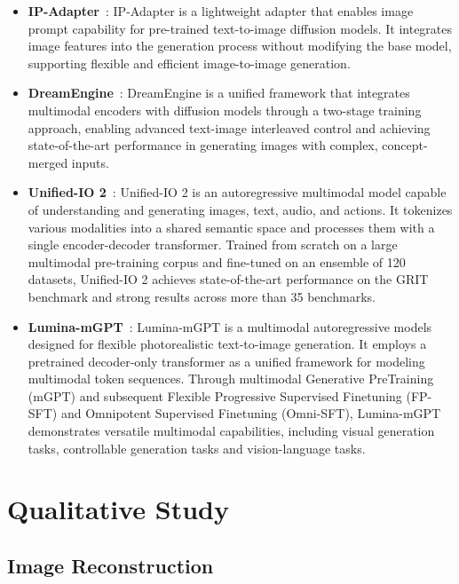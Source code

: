 \begin{itemize}[left=2pt, itemsep=0.5pt,topsep=0.5pt]
\item \textbf{IP-Adapter}~\citep{ye2023ip-adapter}: IP-Adapter is a lightweight adapter that enables image prompt capability for pre-trained text-to-image diffusion models. It integrates image features into the generation process without modifying the base model, supporting flexible and efficient image-to-image generation.

\item \textbf{DreamEngine}~\citep{dreamengine}: DreamEngine is a unified framework that integrates multimodal encoders with diffusion models through a two-stage training approach, enabling advanced text-image interleaved control and achieving state-of-the-art performance in generating images with complex, concept-merged inputs.

\item \textbf{Unified-IO 2}~\citep{lu2023unifiedio2}: Unified-IO 2 is an autoregressive multimodal model capable of understanding and generating images, text, audio, and actions. It tokenizes various modalities into a shared semantic space and processes them with a single encoder-decoder transformer. Trained from scratch on a large multimodal pre-training corpus and fine-tuned on an ensemble of 120 datasets, Unified-IO 2 achieves state-of-the-art performance on the GRIT benchmark and strong results across more than 35 benchmarks. 

\item \textbf{Lumina-mGPT}~\citep{2024lumina}: Lumina-mGPT is a multimodal autoregressive models designed for flexible photorealistic text-to-image generation. It employs a pretrained decoder-only transformer as a unified framework for modeling multimodal token sequences. Through multimodal Generative PreTraining (mGPT) and subsequent Flexible Progressive Supervised Finetuning (FP-SFT) and Omnipotent Supervised Finetuning (Omni-SFT), Lumina-mGPT demonstrates versatile multimodal capabilities, including visual generation tasks, controllable generation tasks and vision-language tasks. 

\end{itemize}



\section{Qualitative Study}
\label{sec:Qualitative_Study}

\subsection{Image Reconstruction}
\label{sec:Reconstruction}

